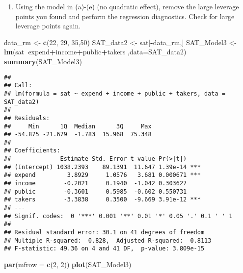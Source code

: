 \documentclass[]{article}
\newenvironment{Shaded}{\begin{snugshade}}{\end{snugshade}}
\newcommand{\KeywordTok}[1]{\textcolor[rgb]{0.13,0.29,0.53}{\textbf{#1}}}
\newcommand{\DataTypeTok}[1]{\textcolor[rgb]{0.13,0.29,0.53}{#1}}
\newcommand{\DecValTok}[1]{\textcolor[rgb]{0.00,0.00,0.81}{#1}}
\newcommand{\StringTok}[1]{\textcolor[rgb]{0.31,0.60,0.02}{#1}}
\newcommand{\OperatorTok}[1]{\textcolor[rgb]{0.81,0.36,0.00}{\textbf{#1}}}
\newcommand{\NormalTok}[1]{#1}
\providecommand{\tightlist}{%
  \setlength{\itemsep}{0pt}\setlength{\parskip}{0pt}}
\begin{document}
\begin{enumerate}
\def\labelenumi{(\alph{enumi})}
\setcounter{enumi}{6}
\tightlist
\item
  Using the model in (a)-(e) (no quadratic effect), remove the large
  leverage points you found and perform the regression diagnostics.
  Check for large leverage points again.
\end{enumerate}

\begin{Shaded}
\begin{Highlighting}[]
\NormalTok{data_rm <-}\StringTok{ }\KeywordTok{c}\NormalTok{(}\DecValTok{22}\NormalTok{, }\DecValTok{29}\NormalTok{, }\DecValTok{35}\NormalTok{,}\DecValTok{50}\NormalTok{)}
\NormalTok{SAT_data2 <-}\StringTok{ }\NormalTok{sat[}\OperatorTok{-}\NormalTok{data_rm,]}
\NormalTok{SAT_Model3 <-}\StringTok{ }\KeywordTok{lm}\NormalTok{(sat}\OperatorTok{~}\NormalTok{expend}\OperatorTok{+}\NormalTok{income}\OperatorTok{+}\NormalTok{public}\OperatorTok{+}\NormalTok{takers ,}\DataTypeTok{data=}\NormalTok{SAT_data2)}
\KeywordTok{summary}\NormalTok{(SAT_Model3)}
\end{Highlighting}
\end{Shaded}

\begin{verbatim}
## 
## Call:
## lm(formula = sat ~ expend + income + public + takers, data = SAT_data2)
## 
## Residuals:
##     Min      1Q  Median      3Q     Max 
## -54.875 -21.679  -1.783  15.968  75.348 
## 
## Coefficients:
##              Estimate Std. Error t value Pr(>|t|)    
## (Intercept) 1038.2393    89.1391  11.647 1.39e-14 ***
## expend         3.8929     1.0576   3.681 0.000671 ***
## income        -0.2021     0.1940  -1.042 0.303627    
## public        -0.3601     0.5985  -0.602 0.550731    
## takers        -3.3838     0.3500  -9.669 3.91e-12 ***
## ---
## Signif. codes:  0 '***' 0.001 '**' 0.01 '*' 0.05 '.' 0.1 ' ' 1
## 
## Residual standard error: 30.1 on 41 degrees of freedom
## Multiple R-squared:  0.828,  Adjusted R-squared:  0.8113 
## F-statistic: 49.36 on 4 and 41 DF,  p-value: 3.809e-15
\end{verbatim}

\begin{Shaded}
\begin{Highlighting}[]
\KeywordTok{par}\NormalTok{(}\DataTypeTok{mfrow =} \KeywordTok{c}\NormalTok{(}\DecValTok{2}\NormalTok{, }\DecValTok{2}\NormalTok{))}
\KeywordTok{plot}\NormalTok{(SAT_Model3)}
\end{Highlighting}
\end{Shaded}
\end{document}
